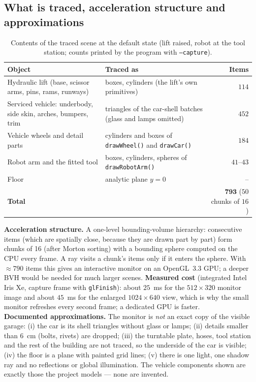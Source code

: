 \documentclass[10pt,a4paper]{article}
\newcommand{\fn}[1]{\texttt{#1}}
\let\oldtoprule\toprule
\renewcommand{\toprule}{\oldtoprule\rowcolor{smhead}}
\begin{document}
\subsection{What is traced, acceleration structure and approximations}
\begin{table}[!htbp]\centering\scriptsize
\caption{Contents of the traced scene at the default state (lift raised, robot at the tool station; counts printed by the program with \fn{--capture}).}\label{tab:rtscene}
\begin{tabular}{@{}l l r@{}}\toprule
Object & Traced as & Items\\\midrule
Hydraulic lift (base, scissor arms, pins, rams, runways) & boxes, cylinders (the lift's own primitives) & $114$\\
Serviced vehicle: underbody, side skin, arches, bumpers, trim & triangles of the car-shell batches (glass and lamps omitted) & $452$\\
Vehicle wheels and detail parts & cylinders and boxes of \fn{drawWheel()} and \fn{drawCar()} & $184$\\
Robot arm and the fitted tool & boxes, cylinders, spheres of \fn{drawRobotArm()} & $41$--$43$\\
Floor & analytic plane $y=0$ & --\\\midrule
\textbf{Total} & & $\mathbf{793}$ ($50$ chunks of $16$)\\\bottomrule
\end{tabular}
\end{table}
\textbf{Acceleration structure.} A one-level bounding-volume hierarchy: consecutive items (which are spatially close, because they are drawn part by part) form chunks of 16 (after Morton sorting) with a bounding sphere computed on the CPU every frame. A ray visits a chunk's items only if it enters the sphere. With $\approx790$ items this gives an interactive monitor on an OpenGL~3.3 GPU; a deeper BVH would be needed for much larger scenes. \textbf{Measured cost} (integrated Intel Iris Xe, capture frame with \fn{glFinish}): about $25$~ms for the $512{\times}320$ monitor image and about $45$~ms for the enlarged $1024{\times}640$ view, which is why the small monitor refreshes every second frame; a dedicated GPU is faster.\\
\textbf{Documented approximations.} The monitor is \emph{not} an exact copy of the visible garage: (i) the car is its shell triangles without glass or lamps; (ii) details smaller than $6$~cm (bolts, rivets) are dropped; (iii) the turntable plate, hoses, tool station and the rest of the building are not traced, so the underside of the car is visible; (iv) the floor is a plane with painted grid lines; (v) there is one light, one shadow ray and no reflections or global illumination. The vehicle components shown are exactly those the project models --- none are invented.
\end{document}
